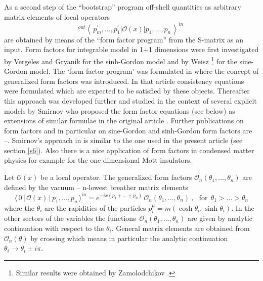 \documentclass[a4paper,a4paper]{article}
\begin{document}
As a second step of the ``bootstrap'' program off-shell quantities as
arbitrary matrix elements of local operators 
\[
^{out}\left\langle \,p_{m}^{\prime },\ldots ,p_{1}^{\prime }\left| \mathcal{O%
}(x)\right| p_{1},\ldots ,p_{n}\,\right\rangle ^{in}\, 
\]
are obtained by means of the ``form factor program'' from the S-matrix as an
input. Form factors for integrable model in 1+1 dimensions were first
investigated by Vergeles and Gryanik \cite{VG} for the sinh-Gordon model and
by Weisz \cite{W}\footnote{%
Similar results were obtained by Zamolodchikov \cite{Za1}.} for the
sine-Gordon model. The `form factor program' was formulated in \cite{KW,BKW}
where the concept of generalized form factors was introduced. In that
article consistency equations were formulated which are expected to be
satisfied by these objects. Thereafter this approach was developed further
and studied in the context of several explicit models by Smirnov \cite{Sm}
who proposed the form factor equations (see below) as extensions of similar
formulae in the original article \cite{KW}. Further publications on form
factors and in particular on sine-Gordon and sinh-Gordon form factors are 
\cite{Sm1}--\cite{CF}. Smirnov's approach in \cite{Sm1} is similar to the
one used in the present article (see section \ref{s6}). Also there is a nice
application \cite{GNT,CET} of form factors in condensed matter physics for
example for the one dimensional Mott insulators.

Let $\mathcal{O}(x)$ be a local operator. The generalized form factors $%
\mathcal{O}_{n}(\theta _{1},\dots ,\theta _{n})$ are defined by the vacuum
-- n-lowest breather matrix elements 
\[
\langle \,0\,|\,\mathcal{O}(x)\,|\,p_{1},\dots ,p_{n}\,\rangle
^{in}=e^{-ix(p_{1}+\dots +p_{n})}\,\mathcal{O}_{n}(\theta _{1},\dots ,\theta
_{n})~,~~~\mathrm{for}~~\theta _{1}>\dots >\theta _{n} 
\]
where the $\theta _{i}$ are the rapidities of the particles $p_{i}^{\mu
}=m(\cosh \theta _{i},\sinh \theta _{i})$. In the other sectors of the
variables the functions $\,\mathcal{O}_{n}(\theta _{1},\dots ,\theta _{n})$
are given by analytic continuation with respect to the $\theta _{i}$.
General matrix elements are obtained from $\mathcal{O}_{n}(\underline{\theta 
})$ by crossing which means in particular the analytic continuation $\theta
_{i}\rightarrow \theta _{i}\pm i\pi $.
\end{document}
